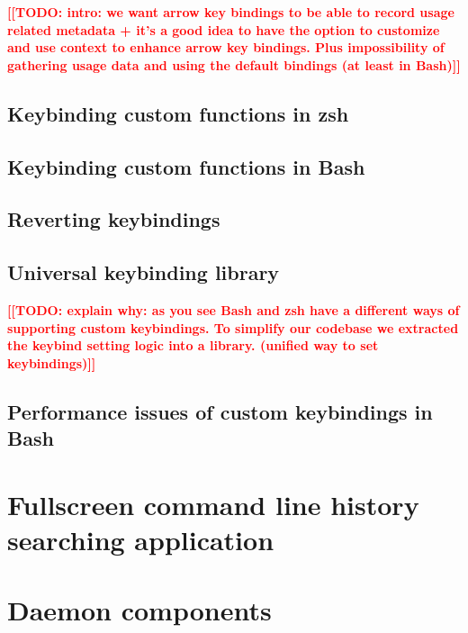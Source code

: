\documentclass[thesis=M,english]{FITthesis}[2012/10/20]
\newcommand{\blind}[1][1]{}
\newcommand{\todotext}[1]{\textcolor{red}{\textbf{[[#1]]}}}
\begin{document}
\todotext{TODO: intro: we want arrow key bindings to be able to record usage related metadata + it's a good idea to have the option to customize and use context to enhance arrow key bindings. Plus impossibility of gathering usage data and using the default bindings (at least in Bash)}

\blind

\subsection{Keybinding custom functions in zsh}

\blind

\subsection{Keybinding custom functions in Bash}

\blind

\subsection{Reverting keybindings}

\blind

\subsection{Universal keybinding library}
\todotext{TODO: explain why: as you see Bash and zsh have a different ways of supporting custom keybindings. To simplify our codebase we extracted the keybind setting logic into a library. (unified way to set keybindings)}

\blind

\subsection{Performance issues of custom keybindings in Bash}

\blind


\section{Fullscreen command line history searching application}



\section{Daemon components}
\end{document}
